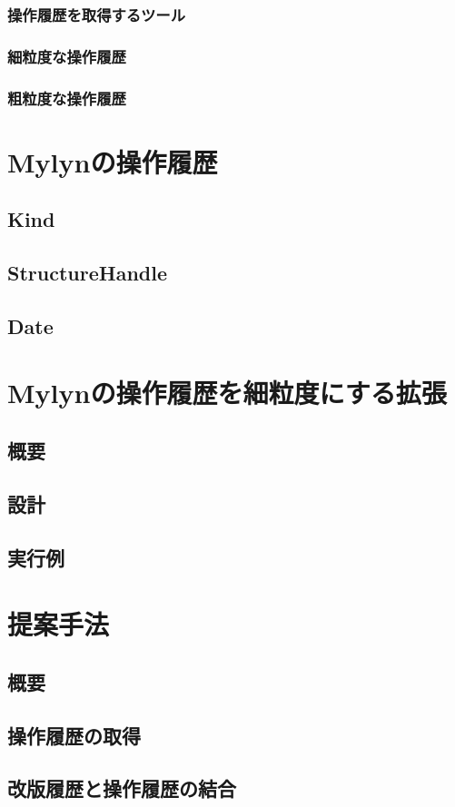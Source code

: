 \documentclass[a4paper]{jsbook}
\begin{document}
\subsection{操作履歴を取得するツール}
\subsection{細粒度な操作履歴}
\subsection{粗粒度な操作履歴}
\chapter{Mylynの操作履歴}
\section{Kind}
\section{StructureHandle}
\section{Date}
\chapter{Mylynの操作履歴を細粒度にする拡張}
\section{概要}
\section{設計}
\section{実行例}
\chapter{提案手法}
\section{概要}
\section{操作履歴の取得}
\section{改版履歴と操作履歴の結合}
\end{document}
